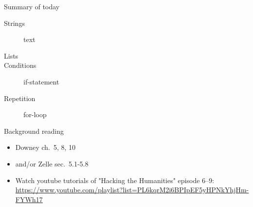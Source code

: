 \documentclass[aspectratio=169,usenames,dvipsnames]{beamer}
\begin{document}
\begin{frame}{Summary of today}
    \begin{description}
        \item[Strings] text
        \item[Lists] 
        \item[Conditions] if-statement
        \item[Repetition] for-loop
    \end{description}
\end{frame}


\begin{frame}{Background reading}
    \begin{itemize}
        \item Downey ch.\ 5, 8, 10
        \item and/or Zelle sec.\ 5.1-5.8
        \item Watch youtube tutorials of "Hacking the Humanities" episode 6--9:
            \url{https://www.youtube.com/playlist?list=PL6kqrM2i6BPIpEF5yHPNkYhjHm-FYWh17}
    \end{itemize}
\end{frame}
\end{document}
